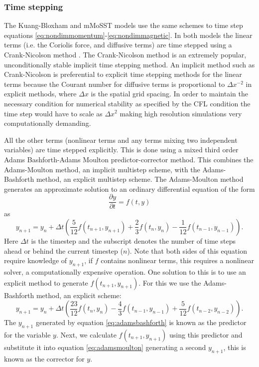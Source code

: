 \subsubsection{Time stepping}
The Kuang-Bloxham and mMoSST models use the same schemes to time step equations \ref{eq:nondimmomentum}-\ref{eq:nondimmagnetic}. In both models the linear terms (i.e. the Coriolis force, and diffusive terms) are time stepped using a Crank-Nicolson method \citep{crank1947}. The Crank-Nicolson method is an extremely popular,  unconditionally stable implicit time stepping method. An implicit method such as Crank-Nicolson is preferential to explicit time stepping methods for the linear terms because the Courant number for diffusive terms is proportional to $\Delta x^{-2}$ in explicit methods, where $\Delta x$ is the spatial grid spacing. In order to maintain the necessary condition for numerical stability as specified by the CFL condition \citep{courant1967} the time step would have to scale as $\Delta x ^{2}$ making high resolution simulations very computationally demanding. 

All the other terms (nonlinear terms and any terms mixing two independent variables) are time stepped explicitly. This is done using a mixed third order Adams Bashforth-Adams Moulton predictor-corrector method. This combines the Adams-Moulton method, an implicit multistep scheme, with the Adams-Bashforth method, an explicit multistep scheme. The Adams-Moulton method generates an approximate solution to an ordinary differential equation of the form
\begin{equation}
\frac{\partial y}{\partial t}=f\left(t, y\right)
\end{equation}
as 
\begin{equation}
\label{eq:adamsmoulton}
y_{n+1} = y_{n} + \Delta t \left( \frac{5}{12} f(t_{n+1},y_{n+1}) + \frac{2}{3} f(t_{n},y_{n}) - \frac{1}{12} f(t_{n-1},y_{n-1}) \right).
\end{equation}
Here $\Delta t$ is the timestep and the subscript denotes the number of time steps ahead or behind the current timestep ($n$). Note that both sides of this equation require knowledge of $y_{n+1}$, if $f$ contains nonlinear terms, this requires a nonlinear solver, a computationally expensive operation.  One solution to this is to use an explicit method to generate $f\left(t_{n+1}, y_{n+1}\right)$. For this we use the Adams-Bashforth method, an explicit scheme:
\begin{equation}
\label{eq:adamsbashforth}
y_{n+1}  = y_{n} + \Delta t\left( \frac{23}{12} f(t_{n}, y_{n}) - \frac43 f(t_{n-1}, y_{n-1}) + \frac{5}{12}f(t_{n-2}, y_{n-2})\right).
\end{equation}
The $y_{n+1}$ generated by equation \ref{eq:adamsbashforth} is known as the predictor for the variable $y$. Next, we calculate $f(t_{n+1},y_{n+1})$ using this predictor and substitute it into equation \ref{eq:adamsmoulton} generating a second $y_{n+1}$, this is known as the corrector for $y$.

